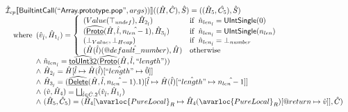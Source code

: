 \[
\begin{array}{ll}



\aI _{cp}\lbr \SF{BuiltintCall}(``\SF{Array.prototype.pop}",args))\rbr((\hat{H},\hat{C}), \hat{S})
  = ((\hat{H}_5, \hat{C_5}), \hat{S})\\
\quad\wherec{
  (\hat{v}_{\hat{l}}, \hat{H}_{1_{\hat{l}}}) = \left\{\begin{array}{ll}
      (Value(\top_{undef}),\hat{H}_{2_{\hat{l}}}) & \ifc{\hat{n}_{len_{\hat{l}}} = \SF{UIntSingle}(0)}\\
      (\ahf{Proto}(\hat{H}, \hat{l}, \hat{n_{len}-1}),\hat{H}_{3_{\hat{l}}}) & \ifc{\hat{n}_{len_{\hat{l}}} = \SF{UIntSingle}(n_{len})}\\
      (\bot_{Value}, \bot_{Heap}) & \ifc{\hat{n}_{len_{\hat{l}}} = \bot_{number}}\\
      (\hat{H}(\hat{l})(\avarprop{default\_number}), \hat{H}) & \owc
    \end{array}\right.\\
  \land\ \hat{n}_{len_{\hat{l}}} = \ahf{toUInt32}(\ahf{Proto}(\hat{H}, \hat{l}, ``length"))\\
  \land\ \hat{H}_{2_{\hat{l}}} = \hat{H}[\hat{l} \mapsto \hat{H}(\hat{l})[\hat{``length"} \mapsto \hat{0}]]\\
  \land\ \hat{H}_{3_{\hat{l}}} = (\ahf{Delete}(\hat{H}, \hat{l}, \hat{n_{len}-1}).1)[\hat{l} \mapsto \hat{H}(\hat{l})[\hat{``length"} \mapsto \hat{n_{len}-1}]]\\
  \land\ (\hat{v}, \hat{H}_4) = \bigsqcup_{\hat{l} \in \hat{C}.2} (\hat{v}_{\hat{l}}, \hat{H}_{1_{\hat{l}}})\\
  \land\ (\hat{H}_5, \hat{C}_5) = 
      (\hat{H}_4[\avarloc{PureLocal}_R \mapsto \hat{H}_4(\avarloc{PureLocal}_R)[\varprop{return} \mapsto \hat{v}]], \hat{C})\\
  }\\
\\\\



\end{array}\]
